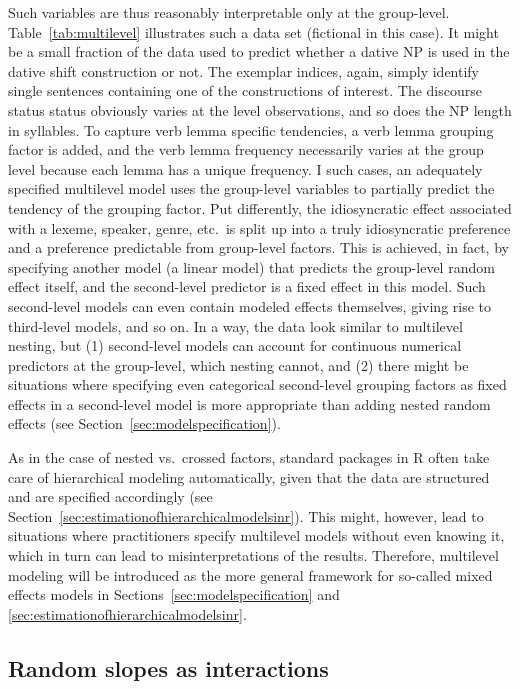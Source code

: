 \documentclass[a4paper,12pt]{article}
\begin{document}
Such variables are thus reasonably interpretable only at the group-level.
Table~\ref{tab:multilevel} illustrates such a data set (fictional in this case).
It might be a small fraction of the data used to predict whether a dative NP is used in the dative shift construction or not.
The exemplar indices, again, simply identify single sentences containing one of the constructions of interest.
The discourse status status obviously varies at the level observations, and so does the NP length in syllables.
To capture verb lemma specific tendencies, a verb lemma grouping factor is added, and the verb lemma frequency necessarily varies at the group level because each lemma has a unique frequency.
I such cases, an adequately specified multilevel model uses the group-level variables to partially predict the tendency of the grouping factor.
Put differently, the idiosyncratic effect associated with a lexeme, speaker, genre, etc.\ is split up into a truly idiosyncratic preference and a preference predictable from group-level factors.
This is achieved, in fact, by specifying another model (a linear model) that predicts the group-level random effect itself, and the second-level predictor is a fixed effect in this model.
Such second-level models can even contain modeled effects themselves, giving rise to third-level models, and so on.
In a way, the data look similar to multilevel nesting, but (1) second-level models can account for continuous numerical predictors at the group-level, which nesting cannot, and (2) there might be situations where specifying even categorical second-level grouping factors as fixed effects in a second-level model is more appropriate than adding nested random effects (see Section~\ref{sec:modelspecification}).

As in the case of nested vs.\ crossed factors, standard packages in R often take care of hierarchical modeling automatically, given that the data are structured and are specified accordingly (see Section~\ref{sec:estimationofhierarchicalmodelsinr}).
This might, however, lead to situations where practitioners specify multilevel models without even knowing it, which in turn can lead to misinterpretations of the results.
Therefore, multilevel modeling will be introduced as the more general framework for so-called mixed effects models in Sections~\ref{sec:modelspecification} and \ref{sec:estimationofhierarchicalmodelsinr}.

\subsection{Random slopes as interactions}
\label{sec:randominterceptsandslopes}
\end{document}
